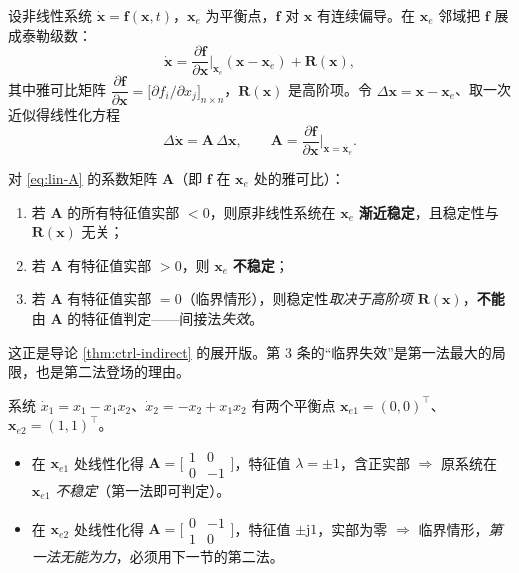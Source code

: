 设非线性系统 $\dot{\mathbf{x}}=\mathbf{f}(\mathbf{x},t)$，$\mathbf{x}_e$ 为平衡点，$\mathbf{f}$ 对 $\mathbf{x}$ 有连续偏导。在 $\mathbf{x}_e$ 邻域把 $\mathbf{f}$ 展成泰勒级数：
\begin{equation}
  \dot{\mathbf{x}}=\frac{\partial\mathbf{f}}{\partial\mathbf{x}}\Big|_{\mathbf{x}_e}(\mathbf{x}-\mathbf{x}_e)+\mathbf{R}(\mathbf{x}),
  \label{eq:taylor-lin}
\end{equation}
其中雅可比矩阵 $\dfrac{\partial\mathbf{f}}{\partial\mathbf{x}}=\big[\partial f_i/\partial x_j\big]_{n\times n}$，$\mathbf{R}(\mathbf{x})$ 是高阶项。令 $\Delta\mathbf{x}=\mathbf{x}-\mathbf{x}_e$、取一次近似得线性化方程
\begin{equation}
  \Delta\dot{\mathbf{x}}=\mathbf{A}\,\Delta\mathbf{x},\qquad \mathbf{A}=\frac{\partial\mathbf{f}}{\partial\mathbf{x}}\Big|_{\mathbf{x}=\mathbf{x}_e}.
  \label{eq:lin-A}
\end{equation}

\begin{theorem}[李雅普诺夫间接法]\label{thm:lyap-indirect}
对 \cref{eq:lin-A} 的系数矩阵 $\mathbf{A}$（即 $\mathbf{f}$ 在 $\mathbf{x}_e$ 处的雅可比）：
\begin{enumerate}
  \item 若 $\mathbf{A}$ 的所有特征值实部 $<0$，则原非线性系统在 $\mathbf{x}_e$ \textbf{渐近稳定}，且稳定性与 $\mathbf{R}(\mathbf{x})$ 无关；
  \item 若 $\mathbf{A}$ 有特征值实部 $>0$，则 $\mathbf{x}_e$ \textbf{不稳定}；
  \item 若 $\mathbf{A}$ 有特征值实部 $=0$（临界情形），则稳定性\emph{取决于高阶项 $\mathbf{R}(\mathbf{x})$}，\textbf{不能}由 $\mathbf{A}$ 的特征值判定——间接法\emph{失效}。
\end{enumerate}
\end{theorem}

\noindent 这正是导论 \cref{thm:ctrl-indirect} 的展开版。第 3 条的“临界失效”是第一法最大的局限，也是第二法登场的理由。

\begin{example}[间接法的成功与失效各一例]\label{ex:lyap-indirect}
系统 $\dot x_1=x_1-x_1x_2$、$\dot x_2=-x_2+x_1x_2$ 有两个平衡点 $\mathbf{x}_{e1}=(0,0)^\top$、$\mathbf{x}_{e2}=(1,1)^\top$。
\begin{itemize}
  \item 在 $\mathbf{x}_{e1}$ 处线性化得 $\mathbf{A}=\big[\begin{smallmatrix}1&0\\0&-1\end{smallmatrix}\big]$，特征值 $\lambda=\pm1$，含正实部 $\Rightarrow$ 原系统在 $\mathbf{x}_{e1}$ \emph{不稳定}（第一法即可判定）。
  \item 在 $\mathbf{x}_{e2}$ 处线性化得 $\mathbf{A}=\big[\begin{smallmatrix}0&-1\\1&0\end{smallmatrix}\big]$，特征值 $\pm\mathrm{j}1$，实部为零 $\Rightarrow$ 临界情形，\emph{第一法无能为力}，必须用下一节的第二法。
\end{itemize}
\end{example}

